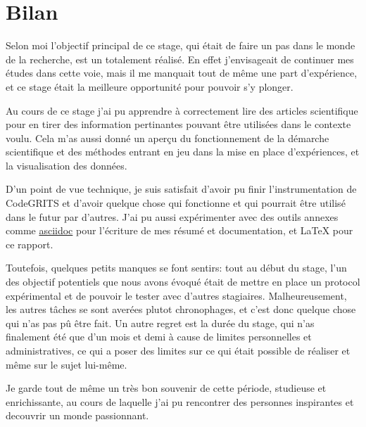 \chapter{Bilan}
\label{bilan}

Selon moi l'objectif principal de ce stage, qui était de faire un pas dans le monde de la recherche, est un totalement réalisé.
En effet j'envisageait de continuer mes études dans cette voie, mais il me manquait tout de même une part d'expérience, et ce stage était la meilleure opportunité pour pouvoir s'y plonger.

Au cours de ce stage j'ai pu apprendre à correctement lire des articles scientifique pour en tirer des information pertinantes pouvant être utilisées dans le contexte voulu.
Cela m'as aussi donné un aperçu du fonctionnement de la démarche scientifique et des méthodes entrant en jeu dans la mise en place d'expériences, et la visualisation des données.

D'un point de vue technique, je suis satisfait d'avoir pu finir l'instrumentation de CodeGRITS et d'avoir quelque chose qui fonctionne et qui pourrait être utilisé dans le futur par d'autres.
J'ai pu aussi expérimenter avec des outils annexes comme \href{https://asciidoc.org/}{asciidoc} pour l'écriture de mes résumé et documentation, et \LaTeX{} pour ce rapport.

Toutefois, quelques petits manques se font sentirs: tout au début du stage, l'un des objectif potentiels que nous avons évoqué était de mettre en place un protocol expérimental et de pouvoir
le tester avec d'autres stagiaires. Malheureusement, les autres tâches se sont averées plutot chronophages, et c'est donc quelque chose qui n'as pas pû être fait.
Un autre regret est la durée du stage, qui n'as finalement été que d'un mois et demi à cause de limites personnelles et administratives,
ce qui a poser des limites sur ce qui était possible de réaliser et même sur le sujet lui-même.

Je garde tout de même un très bon souvenir de cette période, studieuse et enrichissante, au cours de laquelle j'ai pu rencontrer des personnes inspirantes et decouvrir un monde passionnant.
